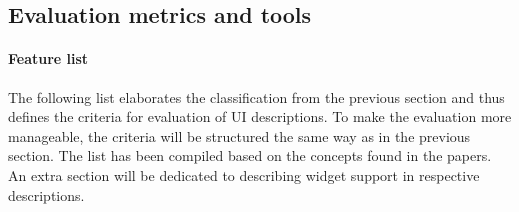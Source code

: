 \subsection{Evaluation metrics and tools}\label{subsec:evaluation-metrics-and-tools}

\paragraph{Feature list}
The following list elaborates the classification from the previous section and thus defines the criteria for evaluation of UI descriptions.
To make the evaluation more manageable, the criteria will be structured the same way as in the previous section.
The list has been compiled based on the concepts found in the papers.
An extra section will be dedicated to describing widget support in respective descriptions.


